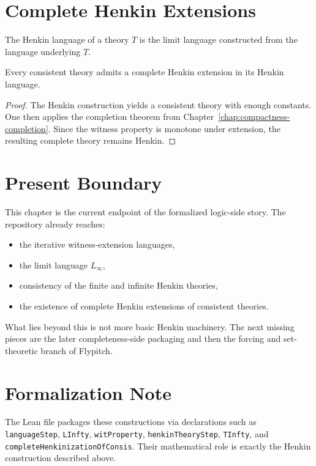 \section{Complete Henkin Extensions}

\begin{definition}
\label{def:henkin-language-over}
The Henkin language of a theory $T$ is the limit language constructed from the
language underlying $T$.
\end{definition}

\begin{theorem}
\label{thm:complete-henkinization}
Every consistent theory admits a complete Henkin extension in its Henkin
language.
\end{theorem}

\begin{proof}
The Henkin construction yields a consistent theory with enough constants. One
then applies the completion theorem from
Chapter~\ref{chap:compactness-completion}. Since the witness property is
monotone under extension, the resulting complete theory remains Henkin.
\end{proof}

\section{Present Boundary}

This chapter is the current endpoint of the formalized logic-side story. The
repository already reaches:
\begin{itemize}
\item the iterative witness-extension languages,
\item the limit language $L_\infty$,
\item consistency of the finite and infinite Henkin theories,
\item the existence of complete Henkin extensions of consistent theories.
\end{itemize}

What lies beyond this is not more basic Henkin machinery. The next missing
pieces are the later completeness-side packaging and then the forcing and
set-theoretic branch of Flypitch.

\section{Formalization Note}

The Lean file packages these constructions via declarations such as
\texttt{languageStep}, \texttt{LInfty}, \texttt{witProperty},
\texttt{henkinTheoryStep}, \texttt{TInfty}, and
\texttt{completeHenkinizationOfConsis}. Their mathematical role is exactly the
Henkin construction described above.

